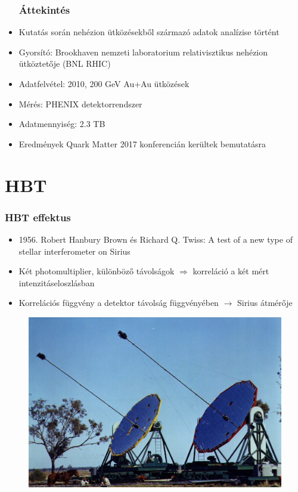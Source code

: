 \documentclass{beamer}
\begin{document}
\begin{frame}
\begin{itemize}
\frametitle{Áttekintés}
\setlength{\itemsep}{14pt}
\item Kutatás során nehézion ütközésekből származó adatok analízise történt
\item Gyorsító: Brookhaven nemzeti laboratorium relativisztikus nehézion ütköztetője (BNL RHIC)
\item Adatfelvétel: 2010, 200 GeV Au+Au ütközések
\item Mérés: PHENIX detektorrendszer
\item Adatmennyiség: 2.3 TB
\item Eredmények Quark Matter 2017 konferencián kerültek bemutatásra
\end{itemize}
\end{frame}

\section{HBT}
\begin{frame}
\frametitle{HBT effektus}
\begin{itemize}
\setlength{\itemsep}{8pt}
\item 1956. Robert Hanbury Brown és Richard Q. Twiss: A test of a new
type of stellar interferometer on Sirius
\item Két photomultiplier, különböző távolságok $\Rightarrow$ korreláció a két mért intenzitáseloszlásban
\item Korrelációs függvény a detektor távolság függvényében $\rightarrow$ Sirius átmérője
\end{itemize}
\begin{figure}
\includegraphics[scale=0.4]{pic/hbtdet.jpg}
\end{figure}
\end{frame}
\end{document}
